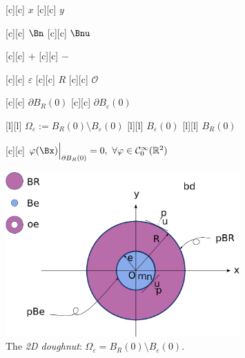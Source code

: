 \begin{figure}[ht]
	\centering
	\footnotesize

	[c] {$x$}
	[c] {$y$}

	[c] {$\Bn$}
	[c] {$\Bnu$}

	[c] {$+$}
	[c] {$-$}

	[c] {$\varepsilon$}
	[c] {$R$}
	[c] {$\mathcal{O}$}

	[c] {$\partial B_{R}(0)$}
	[c] {$\partial B_{\varepsilon}(0)$}

	[l] {$\Omega_{\varepsilon} := B_R(0) \setminus B_\varepsilon (0) $}
	[l] {$B_\varepsilon (0) $}
	[l] {$B_R(0)$}

	[c] {$\varphi(\Bx)\Big|_{\partial B_{R}(0)} = 0, \
		\forall \varphi\in \mathcal{C}^{\infty}_{0}(\mathbb{R}^2) $}

	\includegraphics[width=0.8\textwidth]{ballBRBe.eps}
	\caption{The \textit{2D doughnut}: $\Omega_{\varepsilon} = B_R(0) \setminus B_\varepsilon (0) $.}
	\label{\LABEL}
\end{figure}